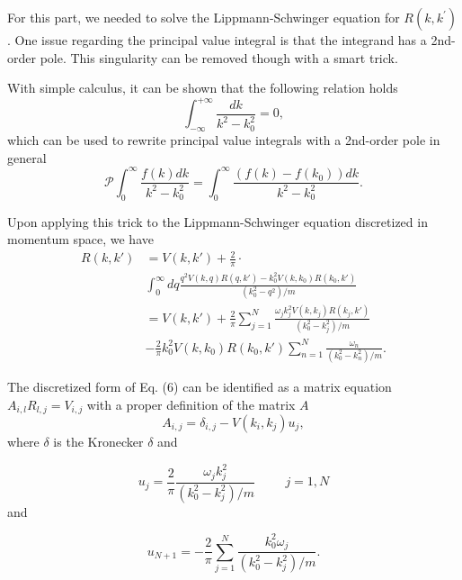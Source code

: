 \documentclass{article}
\begin{document}
\begin{multicols}{2}
For this part, we needed to solve the Lippmann-Schwinger equation for $R(k,k^\prime)$. One issue regarding the principal value integral is that the integrand has a 2nd-order pole. This singularity can be removed though with a smart trick.

With simple calculus, it can be shown that the following relation holds
\begin{equation}
\int_{-\infty}^{+\infty} \frac{dk}{k^2-k_0^2}=0,
\end{equation}
which can be used to rewrite principal value integrals with a 2nd-order pole in general
\begin{equation}
	\mathcal{P}\int_0^{\infty} \frac{f(k)dk}{k^2-k_0^2} = \int_0^{\infty} \frac{(f(k)-f(k_0))dk}{k^2-k_0^2}.
\end{equation}

Upon applying this trick to the Lippmann-Schwinger equation discretized in momentum space, we have
\begin{equation}
\begin{split}
    R(k,k') &= V(k,k') +\frac{2}{\pi} \cdot \\
                &\int_0^{\infty}dq
                \frac{q^2V(k,q)R(q,k')-k_0^2V(k,k_0)R(k_0,k')  }
                     {(k_0^2-q^2)/m} \\
               &= V(k,k') +\frac{2}{\pi}\sum_{j=1}^N\frac{\omega_jk_j^2V(k,k_j)R(k_j,k')}{(k_0^2-k_j^2)/m} \\
               &-\frac{2}{\pi}k_0^2V(k,k_0)R(k_0,k')\sum_{n=1}^N\frac{\omega_n}{(k_0^2-k_n^2)/m}.
\end{split}
\end{equation}

The discretized form of Eq. (6) can be identified as a matrix equation $A_{i,l}R_{l,j}=V_{i,j}$ with a proper definition of the matrix $A$
\begin{equation}        \label{eq:aeq}
A_{i,j}=\delta_{i,j}-V(k_i,k_j)u_j,
\end{equation}
where $\delta$ is the Kronecker $\delta$
and

\begin{equation}
     u_j=\frac{2}{\pi}
         \frac{\omega_jk_j^2}{(k_0^2-k_j^2)/m}\hspace{1cm}
         j=1,N
\end{equation}
and

\begin{equation}
     u_{N+1}=-\frac{2}{\pi}
          \sum_{j=1}^N\frac{k_0^2\omega_j}{(k_0^2-k_j^2)/m}.
\end{equation}


\end{multicols}
\end{document}
